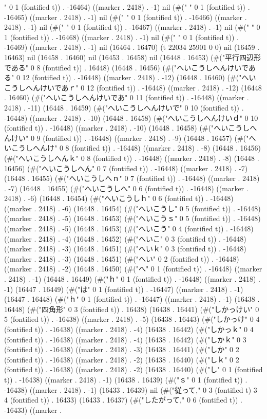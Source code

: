 " 0 1 (fontified t)) . -16464) ((marker . 2418) . -1) nil (#("	" 0 1 (fontified t)) . -16465) ((marker . 2418) . -1) nil (#("	" 0 1 (fontified t)) . -16466) ((marker . 2418) . -1) nil (#(" " 0 1 (fontified t)) . -16467) ((marker . 2418) . -1) nil (#(" " 0 1 (fontified t)) . -16468) ((marker . 2418) . -1) nil (#(" " 0 1 (fontified t)) . -16469) ((marker . 2418) . -1) nil (16464 . 16470) (t 22034 25901 0 0) nil (16459 . 16463) nil (16458 . 16460) nil (16453 . 16458) nil (16448 . 16453) (#("平行四辺形である" 0 8 (fontified t)) . 16448) (16448 . 16456) (#("へいこうしへんけいである" 0 12 (fontified t)) . -16448) ((marker . 2418) . -12) (16448 . 16460) (#("へいこうしへんけいであｒ" 0 12 (fontified t)) . -16448) ((marker . 2418) . -12) (16448 . 16460) (#("へいこうしへんけいであ" 0 11 (fontified t)) . -16448) ((marker . 2418) . -11) (16448 . 16459) (#("へいこうしへんけいで" 0 10 (fontified t)) . -16448) ((marker . 2418) . -10) (16448 . 16458) (#("へいこうしへんけいｄ" 0 10 (fontified t)) . -16448) ((marker . 2418) . -10) (16448 . 16458) (#("へいこうしへんけい" 0 9 (fontified t)) . -16448) ((marker . 2418) . -9) (16448 . 16457) (#("へいこうしへんけ" 0 8 (fontified t)) . -16448) ((marker . 2418) . -8) (16448 . 16456) (#("へいこうしへんｋ" 0 8 (fontified t)) . -16448) ((marker . 2418) . -8) (16448 . 16456) (#("へいこうしへん" 0 7 (fontified t)) . -16448) ((marker . 2418) . -7) (16448 . 16455) (#("へいこうしへｎ" 0 7 (fontified t)) . -16448) ((marker . 2418) . -7) (16448 . 16455) (#("へいこうしへ" 0 6 (fontified t)) . -16448) ((marker . 2418) . -6) (16448 . 16454) (#("へいこうしｈ" 0 6 (fontified t)) . -16448) ((marker . 2418) . -6) (16448 . 16454) (#("へいこうし" 0 5 (fontified t)) . -16448) ((marker . 2418) . -5) (16448 . 16453) (#("へいこうｓ" 0 5 (fontified t)) . -16448) ((marker . 2418) . -5) (16448 . 16453) (#("へいこう" 0 4 (fontified t)) . -16448) ((marker . 2418) . -4) (16448 . 16452) (#("へいこ" 0 3 (fontified t)) . -16448) ((marker . 2418) . -3) (16448 . 16451) (#("へいｋ" 0 3 (fontified t)) . -16448) ((marker . 2418) . -3) (16448 . 16451) (#("へい" 0 2 (fontified t)) . -16448) ((marker . 2418) . -2) (16448 . 16450) (#("へ" 0 1 (fontified t)) . -16448) ((marker . 2418) . -1) (16448 . 16449) (#("ｈ" 0 1 (fontified t)) . -16448) ((marker . 2418) . -1) (16447 . 16449) (#("は" 0 1 (fontified t)) . -16447) ((marker . 2418) . -1) (16447 . 16448) (#("ｈ" 0 1 (fontified t)) . -16447) ((marker . 2418) . -1) (16438 . 16448) (#("四角形" 0 3 (fontified t)) . 16438) (16438 . 16441) (#("しかっけい" 0 5 (fontified t)) . -16438) ((marker . 2418) . -5) (16438 . 16443) (#("しかっけ" 0 4 (fontified t)) . -16438) ((marker . 2418) . -4) (16438 . 16442) (#("しかっｋ" 0 4 (fontified t)) . -16438) ((marker . 2418) . -4) (16438 . 16442) (#("しかｋ" 0 3 (fontified t)) . -16438) ((marker . 2418) . -3) (16438 . 16441) (#("しか" 0 2 (fontified t)) . -16438) ((marker . 2418) . -2) (16438 . 16440) (#("しｋ" 0 2 (fontified t)) . -16438) ((marker . 2418) . -2) (16438 . 16440) (#("し" 0 1 (fontified t)) . -16438) ((marker . 2418) . -1) (16438 . 16439) (#("ｓ" 0 1 (fontified t)) . -16438) ((marker . 2418) . -1) (16433 . 16439) nil (#("従って," 0 3 (fontified t) 3 4 (fontified t)) . 16433) (16433 . 16437) (#("したがって," 0 6 (fontified t)) . -16433) ((marker . 
